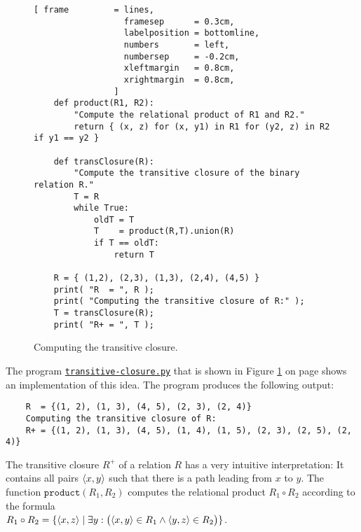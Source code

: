 \begin{figure}[!ht]
  \centering
\begin{Verbatim}[ frame         = lines, 
                  framesep      = 0.3cm, 
                  labelposition = bottomline,
                  numbers       = left,
                  numbersep     = -0.2cm,
                  xleftmargin   = 0.8cm,
                  xrightmargin  = 0.8cm,
                ]
    def product(R1, R2):
        "Compute the relational product of R1 and R2."
        return { (x, z) for (x, y1) in R1 for (y2, z) in R2 if y1 == y2 }
    
    def transClosure(R):
        "Compute the transitive closure of the binary relation R."
        T = R
        while True:
            oldT = T
            T    = product(R,T).union(R)
            if T == oldT:
                return T
    
    R = { (1,2), (2,3), (1,3), (2,4), (4,5) }
    print( "R  = ", R );
    print( "Computing the transitive closure of R:" );
    T = transClosure(R);
    print( "R+ = ", T );
\end{Verbatim} 
\vspace*{-0.3cm}
\caption{Computing the transitive closure.}  
\label{fig:transitive-closure.py}
\end{figure} %

\noindent
The program 
\href{https://github.com/karlstroetmann/Logik/blob/master/Python/transitive-closure.py}{\texttt{transitive-closure.py}}
that is shown in Figure
\ref{fig:transitive-closure.py} on page \pageref{fig:transitive-closure.py} shows an implementation of this idea.
The program produces the following output:
\begin{verbatim}
    R  = {(1, 2), (1, 3), (4, 5), (2, 3), (2, 4)}
    Computing the transitive closure of R:
    R+ = {(1, 2), (1, 3), (4, 5), (1, 4), (1, 5), (2, 3), (2, 5), (2, 4)}
\end{verbatim}
The transitive closure $R^+$ of a relation $R$ has a very intuitive interpretation:
It contains all pairs $\pair(x,y)$ such that there is a path leading from 
$x$ to $y$.  
The function $\texttt{product}(R_1, R_2)$ computes the relational product $R_1\circ R_2$ 
according to the formula
\\[0.2cm]
\hspace*{1.3cm}
$R_1 \circ R_2 = \{ \langle x, z \rangle \mid \exists y:\bigl(\pair(x,y) \in R_1 \wedge \pair(y,z) \in R_2\bigr) \}$.


